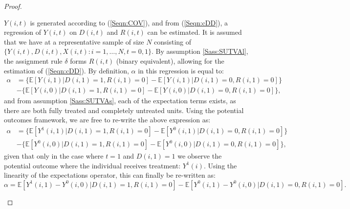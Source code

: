 \begin{proof}
\begin{footnotesize}
$Y(i,t)$ is generated according to (\ref{Seqn:COV}), and from (\ref{Seqn:cDD}),
a regression of $Y(i,t)$ on $D(i,t)$ and $R(i,t)$ can be estimated.  It is assumed that
we have at a representative sample of size $N$ consisting of $\{Y(i,t), D(i,t), 
X(i,t): i=1, \ldots, N, t=0, 1\}$.  By assumption \ref{Sass:SUTVAl}, the assignment
rule $\delta$ forms $R(i,t)$ (binary equivalent), allowing for the estimation of
(\ref{Seqn:cDD}).  By definition, $\alpha$ in this regression is equal to:
\begin{equation}
\nonumber
\label{Seqn:alphaProof1}
\begin{split}
\alpha&=\{\mathbb{E}[Y(i,1)|D(i,1)=1,R(i,1)=0]-\mathbb{E}[Y(i,1)|D(i,1)=0,R(i,1)=0]\} \\
      &-\{\mathbb{E}[Y(i,0)|D(i,1)=1,R(i,1)=0]-\mathbb{E}[Y(i,0)|D(i,1)=0,R(i,1)=0]\},
\end{split}
\end{equation}
and from assumption \ref{Sass:SUTVAs}, each of the expectation terms exists, as there
are both fully treated and completely untreated units.  Using the potential outcomes 
framework, we are free to re-write the above expression as:
\begin{equation}
\nonumber
\label{Seqn:alphaProof2}
\begin{split}
\alpha&=\{\mathbb{E}[Y^1(i,1)|D(i,1)=1,R(i,1)=0]-\mathbb{E}[Y^0(i,1)|D(i,1)=0,R(i,1)=0]\} \\
      &-\{\mathbb{E}[Y^0(i,0)|D(i,1)=1,R(i,1)=0]-\mathbb{E}[Y^0(i,0)|D(i,1)=0,R(i,1)=0]\},
\end{split}
\end{equation}
given that only in the case where $t=1$ and $D(i,1)=1$ we observe the potential 
outcome where the individual receives treatment: $Y^1(i)$.  Using the linearity
of the expectations operator, this can finally be re-written as:
\begin{equation}
\nonumber
\label{Seqn:alphaProof3}
\alpha=\mathbb{E}[Y^1(i,1)-Y^0(i,0)|D(i,1)=1,R(i,1)=0] - \mathbb{E}[Y^0(i,1)-Y^0(i,0)|D(i,1)=0,R(i,1)=0].
\end{equation}


\end{footnotesize}
\end{proof}
